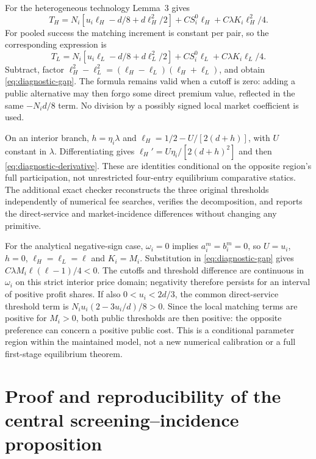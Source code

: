 For the heterogeneous technology Lemma~3 gives
\[
 T_H=N_i[u_i\ell_H-d/8+d\ell_H^2/2]+CS_i^0\ell_H
       +C\lambda K_i\ell_H^2/4.
\]
For pooled success the matching increment is constant per pair, so the corresponding expression is
\[
 T_L=N_i[u_i\ell_L-d/8+d\ell_L^2/2]+CS_i^0\ell_L
       +C\lambda K_i\ell_L/4.
\]
Subtract, factor $\ell_H^2-\ell_L^2=(\ell_H-\ell_L)(\ell_H+\ell_L)$, and obtain \eqref{eq:diagnostic-gap}.
The formula remains valid when a cutoff is zero: adding a public alternative may then forgo some direct premium value, reflected in the same $-N_id/8$ term.
No division by a possibly signed local market coefficient is used.

On an interior branch, $h=\eta_i\lambda$ and $\ell_H=1/2-U/[2(d+h)]$, with $U$ constant in $\lambda$.
Differentiating gives $\ell_H'=U\eta_i/[2(d+h)^2]$ and then \eqref{eq:diagnostic-derivative}.
These are identities conditional on the opposite region's full participation, not unrestricted four-entry equilibrium comparative statics.
The additional exact checker reconstructs the three original thresholds independently of numerical fee searches, verifies the decomposition, and reports the direct-service and market-incidence differences without changing any primitive.

For the analytical negative-sign case, $\omega_i=0$ implies $a_i^m=b_i^m=0$, so $U=u_i$, $h=0$, $\ell_H=\ell_L=\ell$ and $K_i=M_i$.
Substitution in \eqref{eq:diagnostic-gap} gives $C\lambda M_i\ell(\ell-1)/4<0$.
The cutoffs and threshold difference are continuous in $\omega_i$ on this strict interior price domain; negativity therefore persists for an interval of positive profit shares.
If also $0<u_i<2d/3$, the common direct-service threshold term is $N_i u_i(2-3u_i/d)/8>0$.
Since the local matching terms are positive for $M_i>0$, both public thresholds are then positive: the opposite preference can concern a positive public cost.
This is a conditional parameter region within the maintained model, not a new numerical calibration or a full first-stage equilibrium theorem.


\clearpage
\section{Proof and reproducibility of the central screening--incidence proposition}\label{app:screening-incidence}

